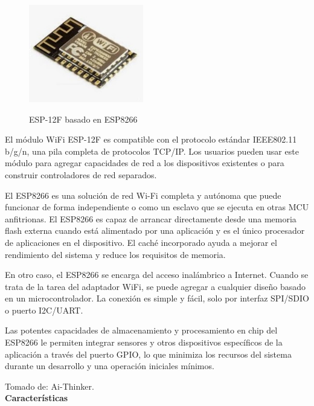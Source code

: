     \begin{figure}[H]
        \centering
        \includegraphics[width=5cm, height=5cm]{imagenes/esp-12F.jpeg}
        \caption{ESP-12F basado en ESP8266}
        \label{imag:esp-12F}
    \end{figure}

    El módulo WiFi ESP-12F es compatible con el protocolo estándar IEEE802.11 b/g/n, una pila completa de protocolos TCP/IP. Los usuarios pueden usar este módulo para agregar capacidades de red a los dispositivos existentes o para construir controladores de red separados.
    
    El ESP8266 es una solución de red Wi-Fi completa y autónoma que puede funcionar de forma independiente o como un esclavo que se ejecuta en otras MCU anfitrionas. El ESP8266 es capaz de arrancar directamente desde una memoria flash externa cuando está alimentado por una aplicación y es el único procesador de aplicaciones en el dispositivo. El caché incorporado ayuda a mejorar el rendimiento del sistema y reduce los requisitos de memoria.

    En otro caso, el ESP8266 se encarga del acceso inalámbrico a Internet. Cuando se trata de la tarea del adaptador WiFi, se puede agregar a cualquier diseño basado en un microcontrolador. La conexión es simple y fácil, solo por interfaz SPI/SDIO o puerto I2C/UART.

    Las potentes capacidades de almacenamiento y procesamiento en chip del ESP8266 le permiten integrar sensores y otros dispositivos específicos de la aplicación a través del puerto GPIO, lo que minimiza los recursos del sistema durante un desarrollo y una operación iniciales mínimos.

    Tomado de: Ai-Thinker\cite{esp12}.\\

    \textbf{Características}

